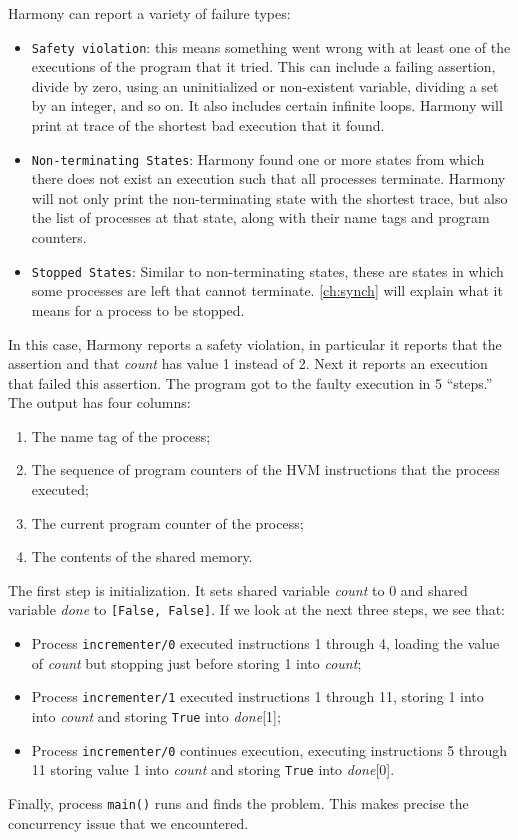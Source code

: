 \documentclass{report}
\begin{document}
Harmony can report a variety of failure types:
\begin{itemize}
\item \texttt{Safety violation}: this means something went wrong with
at least one of the executions of the program that it tried.  This
can include a failing assertion, divide by zero, using an uninitialized
or non-existent variable, dividing a set by an integer, and so on.
It also includes certain infinite loops.
Harmony will print at trace of the shortest bad execution that it found.
\item \texttt{Non-terminating States}: Harmony found one or more states
from which there does not exist an execution such that all processes
terminate.  Harmony will not only print the non-terminating state with
the shortest trace, but also the list of processes
at that state, along with their name tags and program counters.
\item \texttt{Stopped States}: Similar to non-terminating states,
these are states in which some processes are left that cannot
terminate.  \autoref{ch:synch} will explain what it means for
a process to be stopped.
\end{itemize}

In this case, Harmony reports a safety violation, in particular it
reports that the assertion and that
\textit{count} has value 1 instead of 2.
Next it reports an execution that failed this assertion.
The program got to the faulty execution in 5 ``steps.''
The output has
four columns:
\begin{enumerate}
\item The name tag of the process;
\item The sequence of program counters of the HVM instructions that the process executed;
\item The current program counter of the process;
\item The contents of the shared memory.
\end{enumerate}

The first step is initialization.
It sets shared variable \textit{count} to 0 and
shared variable \textit{done} to \texttt{[False, False]}.
If we look at the next three steps, we see that:
\begin{itemize}
\item Process \texttt{incrementer/0}
executed instructions 1 through 4, loading the value of
\textit{count} but stopping just before storing 1 into \textit{count};
\item Process \texttt{incrementer/1}
executed instructions 1 through 11, storing 1 into
into \textit{count} and storing \texttt{True} into \textit{done}[1];
\item Process \texttt{incrementer/0}
continues execution, executing instructions 5 through 11
storing value 1 into \textit{count}
and storing \texttt{True} into \textit{done}[0].
\end{itemize}
Finally, process \texttt{main()} runs and finds the problem.
This makes precise the concurrency issue that we encountered.
\end{document}
